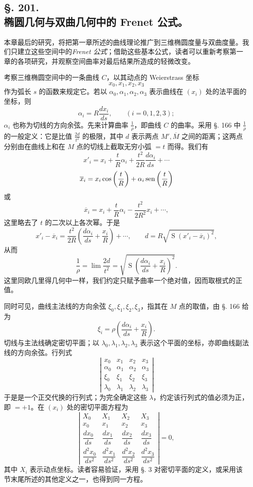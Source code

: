\subsection*{§. 201.\\ 椭圆几何与双曲几何中的 Frenet 公式。}

本章最后的研究，将把第一章所述的曲线理论推广到三维椭圆度量与双曲度量。我们只建立这些空间中的\emph{Frenet 公式}；借助这些基本公式，读者可以重新考察第一章的各项研究，并观察空间曲率对最后结果所造成的轻微改变。

考察三维椭圆空间中的一条曲线 \(C\)，以其动点的 Weierstrass 坐标
\[
 x_0,x_1,x_2,x_3
\]
作为弧长 \(s\) 的函数来规定它。若以 \(\alpha_0,\alpha_1,\alpha_2,\alpha_3\) 表示曲线在 \((x_i)\) 处的法平面的坐标，则
\[
\tag{45}
 \alpha_i=R\frac{dx_i}{ds},\qquad (i=0,1,2,3);
\]
\(\alpha_i\) 也称为切线的方向余弦。先来计算曲率 \(\frac1\rho\)，即曲线 \(C\) 的曲率。采用 §. 166 中 \(\frac1\rho\) 的一般定义：它是比值 \(\frac{2d}{t^2}\) 的极限，其中 \(d\) 表示两点 \(M',\overline{M}\) 之间的距离；这两点分别由在曲线上和在 \(M\) 点的切线上截取无穷小弧 \(=t\) 而得。我们有
\[
 x'_i=x_i+\frac tR\alpha_i+\frac{t^2}{2R}\frac{d\alpha_i}{ds}+\cdots
\]
\[
 \overline{x}_i=x_i\cos\left(\frac tR\right)+\alpha_i\operatorname{sen}\left(\frac tR\right)
\]
或
\[
 \overline{x}_i=x_i+\frac tR\alpha_i-\frac{t^2}{2R^2}x_i+\cdots,
\]
这里略去了 \(t\) 的二次以上各次幂。于是
\[
 x'_i-\overline{x}_i=\frac{t^2}{2R}\left(\frac{d\alpha_i}{ds}+\frac{x_i}{R}\right)+\cdots,
 \qquad
 d=R\sqrt{\mathop{\mathrm{S}}(x'_i-\overline{x}_i)^2},
\]
从而
\[
 \frac1\rho=\lim\frac{2d}{t^2}=\sqrt{\mathop{\mathrm{S}}\left(\frac{d\alpha_i}{ds}+\frac{x_i}{R}\right)^2}.
\]
这里同欧几里得几何中一样，我们约定只赋予曲率一个绝对值，因而取根式的正值。

同时可见，曲线主法线的方向余弦 \(\xi_0,\xi_1,\xi_2,\xi_3\)，指其在 \(M\) 点的取值，由 §. 166 给为
\[
\tag{46}
 \xi_i=\rho\left(\frac{d\alpha_i}{ds}+\frac{x_i}{R}\right).
\]
切线与主法线确定密切平面；以 \(\lambda_0,\lambda_1,\lambda_2,\lambda_3\) 表示这个平面的坐标，亦即曲线副法线的方向余弦。行列式
\[
\tag{47}
\left|
\begin{matrix}
 x_0&x_1&x_2&x_3\\
 \alpha_0&\alpha_1&\alpha_2&\alpha_3\\
 \xi_0&\xi_1&\xi_2&\xi_3\\
 \lambda_0&\lambda_1&\lambda_2&\lambda_3
\end{matrix}\right|
\]
于是是一个正交代换的行列式；为完全确定这些 \(\lambda\)，约定该行列式的值必须为正，即 \(=+1\)。在 \((x_i)\) 处的密切平面方程为
\[
\left|
\begin{matrix}
 X_0&X_1&X_2&X_3\\
 x_0&x_1&x_2&x_3\\
 \dfrac{dx_0}{ds}&\dfrac{dx_1}{ds}&\dfrac{dx_2}{ds}&\dfrac{dx_3}{ds}\\
 \dfrac{d^2x_0}{ds^2}&\dfrac{d^2x_1}{ds^2}&\dfrac{d^2x_2}{ds^2}&\dfrac{d^2x_3}{ds^2}
\end{matrix}\right|=0,
\]
其中 \(X_i\) 表示动点坐标。读者容易验证，采用 §. 3 对密切平面的定义，或采用该节末尾所述的其他定义之一，也得到同一方程。


